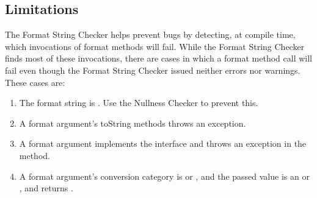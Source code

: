% 
% 
% 
% 

\subsection{Limitations}

The Format String Checker helps prevent bugs by detecting, at compile time,
which invocations of format methods will fail. While the Format String Checker
finds most of these invocations, there are cases in which a format method call
will fail even though the Format String Checker issued neither errors nor
warnings. These cases are:

\begin{enumerate}
\item The format string is . Use the Nullness Checker to prevent this.
\item A format argument's toString methods throws an exception.
\item A format argument implements the  interface and throws an
    exception in the  method.
\item A format argument's conversion category is  or ,
    and the passed value is an  or , and 
     returns .
\end{enumerate}

